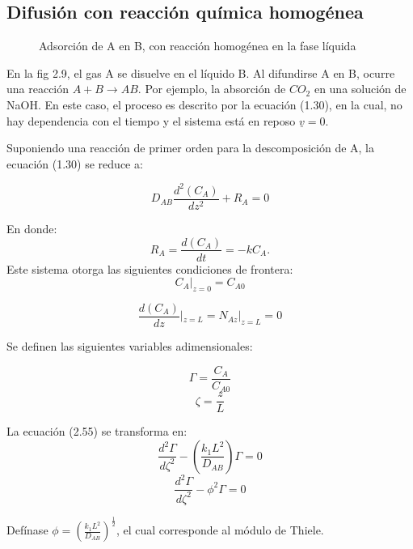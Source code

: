 
\subsection{Difusión con reacción química homogénea}

\begin{figure}
    \centering
    \caption{Adsorción de A en B, con reacción homogénea en la fase líquida}
\end{figure}

En la fig 2.9, el gas A se disuelve en el líquido B. Al difundirse A en B, ocurre una reacción $A+B\xrightarrow{}AB$. Por ejemplo, la absorción de $CO_2$ en una solución de NaOH.
En este caso, el proceso es descrito por la ecuación (1.30), en la cual, no hay dependencia con el tiempo y el sistema está en reposo $\underline{v}=0$. 

Suponiendo una reacción de primer orden para la descomposición de A, la ecuación (1.30) se reduce a:

\begin{equation}   
 D_{AB}\frac{d^2(C_A)}{dz^2}+R_A=0
\end{equation}


En donde:\begin{equation}
    R_A=\frac{d(C_A)}{dt}=-kC_A.   
\end{equation}
Este sistema otorga las siguientes condiciones de frontera:
\begin{equation}
    C_A|_{z=0}=C_{A0}  
\end{equation}

\begin{equation}
    \frac{d(C_A)}{dz}|_{z=L}=N_{Az}|_{z=L}=0
\end{equation}

Se definen las siguientes variables adimensionales:

$$\Gamma=\frac{C_A}{C_{A0}}$$ $$\zeta=\frac{z}{L}$$

La ecuación (2.55) se transforma en:
\begin{equation}
    \frac{d^2\Gamma}{d\zeta^2}-(\frac{k_1L^2}{D_{AB}})\Gamma=0
\end{equation}
\begin{equation}
  \frac{d^2\Gamma}{d\zeta^2}-\phi^2\Gamma=0  
\end{equation}

Defínase $\phi=(\frac{k_1L^2}{D_{AB}})^\frac{1}{2}$, el cual corresponde al módulo de Thiele.

